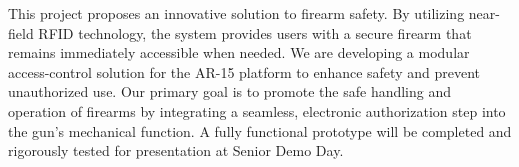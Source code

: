 This project proposes an innovative solution to firearm safety. By utilizing near-field RFID technology, the system provides users with a secure firearm that remains immediately accessible when needed. We are developing a modular access-control solution for the AR-15 platform to enhance safety and prevent unauthorized use. Our primary goal is to promote the safe handling and operation of firearms by integrating a seamless, electronic authorization step into the gun's mechanical function. A fully functional prototype will be completed and rigorously tested for presentation at Senior Demo Day.

